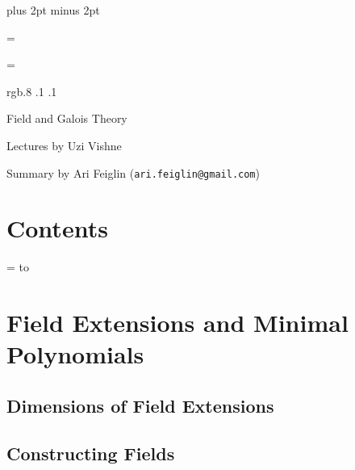 

\parindent=0pt
\parskip=3pt plus 2pt minus 2pt



\footline={}


\headline={}

\color rgb{.8 .1 .1}

{\def\boxshadowcolor{rgb{.6 .4 .6}}

    \centerline{Field and Galois Theory}
    \smallskip
    \centerline{Lectures by Uzi Vishne}
    \centerline{Summary by Ari Feiglin ({\tt ari.feiglin@gmail.com})}

\eppbox

\bigskip

    \section*{Contents}
    
    \tableofcontents
\eppbox

}

\vfill\break

\color{black}

\newif\ifpageodd
\pageoddtrue
\headline={%
    \hbox to \hsize{\color{black}%
        \ifpageodd\hfil{\it\currsubsection\quad\bf\folio}\global\pageoddfalse%
        \else{\bf\folio\quad\it\currsubsection}\hfil\global\pageoddtrue\fi%
    }%
}

\vfill\break

\section{Field Extensions and Minimal Polynomials}

\subsection{Dimensions of Field Extensions}



\subsection{Constructing Fields}

